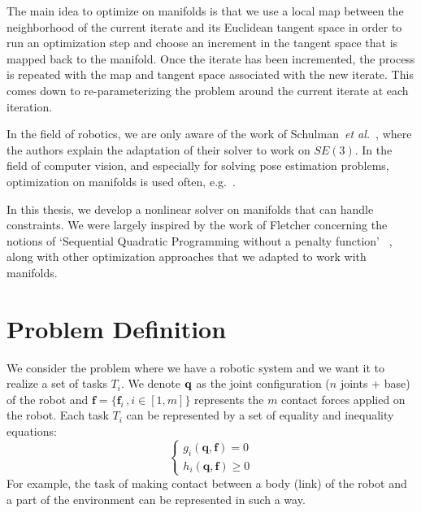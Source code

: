The main idea to optimize on manifolds is that we use a local map between the neighborhood of the current iterate and its Euclidean tangent space in order to run an optimization step and choose an increment in the tangent space that is mapped back to the manifold.
Once the iterate has been incremented, the process is repeated with the map and tangent space associated with the new iterate.
This comes down to re-parameterizing the problem around the current iterate at each iteration.

In the field of robotics, we are only aware of the work of Schulman~\emph{et al.}~\cite{Schulman2014}, where the authors explain the adaptation of their solver to work on $SE(3)$.
In the field of computer vision, and especially for solving pose estimation problems, optimization on manifolds is used often, e.g.~\cite{hertzberg2011, lu2000fast}.

In this thesis, we develop a nonlinear solver on manifolds that can handle constraints.
We were largely inspired by the work of Fletcher concerning the notions of `Sequential Quadratic Programming without a penalty function' ~\cite{Fletcher:ifip:2006, fletcher2010sequential, fletcher:mathprog:2000}, along with other optimization approaches that we adapted to work with manifolds.

\section{Problem Definition}
\label{sec:problem_definition}


We consider the problem where we have a robotic system and we want it to realize a set of tasks $T_i$.
We denote $\bf q$ as the joint configuration ($n$ joints + base) of the robot and $\mathbf{f} =\{\mathbf{f}_i\,, i\in[1,m]\}$ represents the $m$ contact forces applied on the robot.
Each task $T_i$ can be represented by a set of equality and inequality equations:
\begin{equation}
  \left\{
    \begin{aligned}
    g_i(\mathbf{q},\mathbf{f}) = 0\\
    h_i(\mathbf{q},\mathbf{f}) \geq 0
    \end{aligned}
  \right.
\end{equation}
For example, the task of making contact between a body (link) of the robot and a part of the environment can be represented in such a way.

